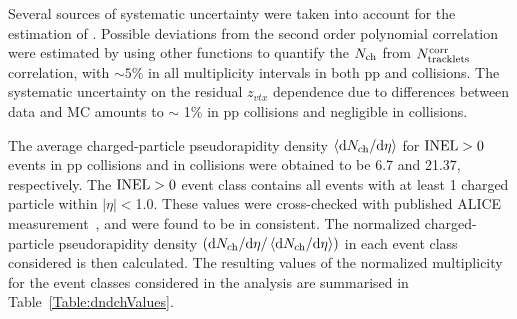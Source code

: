 Several sources of systematic uncertainty were taken into account for the estimation of \dnchdeta. Possible deviations from the second order polynomial correlation were estimated by using other functions to quantify the $N_{\rm{ch}}$ from $N^{\rm{corr}}_{\rm{tracklets}}$ correlation, with   $\sim 5\%$ in all  multiplicity intervals in both pp and \pPb collisions.
The systematic uncertainty on the residual $z_{vtx}$ dependence due to differences between data and MC amounts to  $\sim$ 1\% in pp collisions and negligible in \pPb collisions. 

The average charged-particle pseudorapidity density $\left<{\rm d}N_{\rm ch}/{\rm d}\eta\right>$ for $\rm{INEL}>0$ events in pp collisions and in \pPb collisions were obtained to be  6.7 and 21.37, respectively. The $\rm{INEL}>0$ event class contains all events with at least 1 charged particle within $|\eta| < $1.0.  These values were cross-checked with published ALICE measurement~\cite{Adam:2015pza,Acharya:2020pit,Acharya:2020giw}, and were found to be in consistent. The normalized charged-particle pseudorapidity density $\left( {\rm d}N_{\rm ch}/{\rm d}\eta/\left<{\rm d}N_{\rm ch}/{\rm d}\eta\right> \right)$ in each event class considered is then calculated.  The resulting values of the normalized multiplicity for the event classes considered in the analysis are summarised in Table~\ref{Table:dndchValues}.

